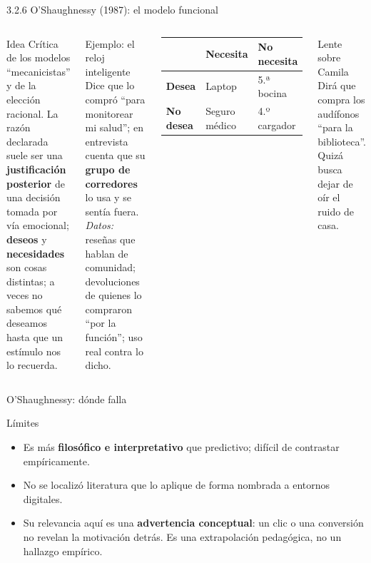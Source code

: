 \documentclass[aspectratio=169,xcolor=dvipsnames]{beamer}
\begin{document}
\begin{frame}{3.2.6 O'Shaughnessy (1987): el modelo funcional}
\begin{columns}[T]
  \begin{block}{Idea}
    \footnotesize Crítica de los modelos \enquote{mecanicistas} y de la elección racional. La razón declarada suele ser una \textbf{justificación posterior} de una decisión tomada por vía emocional; \textbf{deseos} y \textbf{necesidades} son cosas distintas; a veces no sabemos qué deseamos hasta que un estímulo nos lo recuerda.
  \end{block}
  \begin{exampleblock}{Ejemplo: el reloj inteligente}
    \scriptsize Dice que lo compró \enquote{para monitorear mi salud}; en entrevista cuenta que su \textbf{grupo de corredores} lo usa y se sentía fuera. \textit{Datos:} reseñas que hablan de comunidad; devoluciones de quienes lo compraron \enquote{por la función}; uso real contra lo dicho.
  \end{exampleblock}
  \begin{center}
  \footnotesize
  \begin{tabular}{@{}lll@{}}
  \toprule
   & \textbf{Necesita} & \textbf{No necesita} \\
  \midrule
  \textbf{Desea} & Laptop & 5.ª bocina \\
  \textbf{No desea} & Seguro médico & 4.º cargador \\
  \bottomrule
  \end{tabular}
  \end{center}
  \vspace{2pt}
  \begin{alertblock}{Lente sobre Camila}
    \footnotesize Dirá que compra los audífonos \enquote{para la biblioteca}. Quizá busca dejar de oír el ruido de casa.
  \end{alertblock}
\end{columns}
\end{frame}

\begin{frame}{O'Shaughnessy: dónde falla}
\begin{block}{Límites}
  \small
  \begin{itemize}
    \item Es más \textbf{filosófico e interpretativo} que predictivo; difícil de contrastar empíricamente.
    \item No se localizó literatura que lo aplique de forma nombrada a entornos digitales.
    \item Su relevancia aquí es una \textbf{advertencia conceptual}: un clic o una conversión no revelan la motivación detrás. Es una extrapolación pedagógica, no un hallazgo empírico.
  \end{itemize}
\end{block}
\end{frame}
\end{document}
